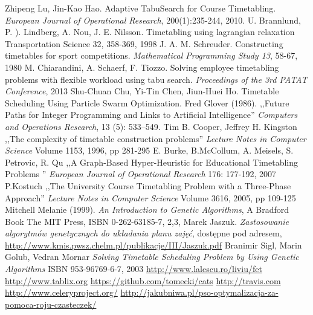 \documentclass[11pt]{report}
\begin{document}
\begin{thebibliography}{2}
 Zhipeng Lu, Jin-Kao Hao. Adaptive TabuSearch for Course Timetabling.  \emph{European Journal of Operational Research}, 200(1):235-244, 2010.
 U. Brannlund, P. ). Lindberg, A. Nou, J. E. Nilsson. Timetabling using lagrangian relaxation Transportation Science 32, 358-369, 1998
 J. A. M. Schreuder. Constructing timetables for sport competitions. \emph{Mathematical Programming Study 13}, 58-67, 1980
 M. Chiarandini, A. Schaerf, F. Tiozzo. Solving employee timetabling problems with flexible workload using tabu search. \emph{Proceedings of the 3rd PATAT Conference}, 2013
 Shu-Chuan Chu, Yi-Tin Chen, Jiun-Huei Ho. Timetable Scheduling Using Particle Swarm Optimization. 
 Fred Glover (1986). ,,Future Paths for Integer Programming and Links to Artificial Intelligence'' \emph{Computers and Operations Research}, 13 (5): 533–549.
 Tim B. Cooper, Jeffrey H. Kingston ,,The complexity of timetable construction problems''  \emph{Lecture Notes in Computer Science} Volume 1153, 1996, pp 281-295 
  E. Burke, B.McCollum, A. Meisels, S. Petrovic, R. Qu ,,A Graph-Based Hyper-Heuristic for Educational Timetabling Problems '' \emph{European Journal of Operational Research} 176: 177-192, 2007
 P.Kostuch ,,The University Course Timetabling Problem with a Three-Phase Approach'' \emph{
Lecture Notes in Computer Science} Volume 3616, 2005, pp 109-125
 Mitchell Melanie (1999). \emph{An Introduction to Genetic Algorithms}, A Bradford Book The MIT Press, ISBN 0-262-63185-7, 2,3,
 Marek Jaszuk. \emph{Zastosowanie algorytmów genetycznych do układania planu zajęć}, dostępne pod adresem, \url{http://www.kmis.pwsz.chelm.pl/publikacje/III/Jaszuk.pdf}
 Branimir Sigl, Marin Golub, Vedran Mornar \emph{Solving Timetable Scheduling Problem by Using Genetic Algorithms} ISBN 953-96769-6-7, 2003
 \url{http://www.lalescu.ro/liviu/fet}
 \url{http://www.tablix.org}
 \url{https://github.com/tomecki/cats}
 \url{http://travis.com}
 \url{http://www.celeryproject.org/}
 \url{http://jakubniwa.pl/pso-optymalizacja-za-pomoca-roju-czasteczek/}
\end{thebibliography}
\end{document}

